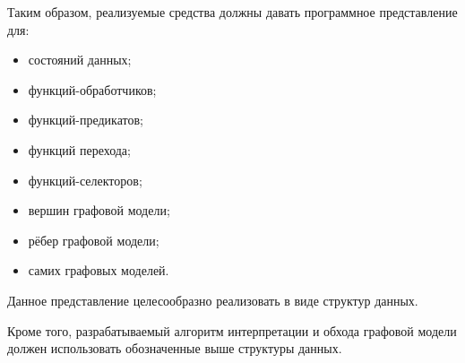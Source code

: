 Таким образом, реализуемые средства должны давать программное представление для:
\begin{itemize}
    \item состояний данных;
    \item функций-обработчиков;
    \item функций-предикатов;
    \item функций перехода;
    \item функций-селекторов;
    \item вершин графовой модели;
    \item рёбер графовой модели;
    \item самих графовых моделей.
\end{itemize}
Данное представление целесообразно реализовать в виде структур данных.

Кроме того, разрабатываемый алгоритм интерпретации и обхода графовой модели должен использовать обозначенные выше структуры данных.
